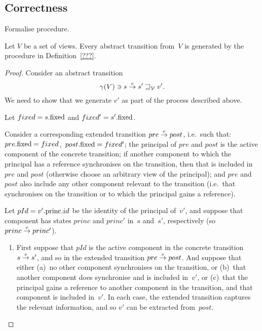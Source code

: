 


\subsection{Correctness}

Formalise procedure.

\begin{lemma}
Let $V$ be a set of views.  Every abstract transition from~$V$ is generated by
the procedure in Definition~\ref{???}.
\end{lemma}

\begin{proof}
Consider an abstract transition
\[
\gamma(V) \ni s \stackrel{e}\rightarrow s' \sqsupseteq_{\mathcal{V}} v'.
\]
We need to show that we generate $v'$ as part of the process described above.

Let $fixed = s.\mathrm{fixed}$ and $fixed' = s'.\mathrm{fixed}$.  

Consider a corresponding extended transition $pre \stackrel{e}\rightarrow post$, i.e.~such
that: $pre.\mathrm{fixed} = fixed$,\, $post.\mathrm{fixed} = fixed'$; the principal of $pre$
and $post$ is the active component of the concrete transition; if another
component to which the principal has a reference synchronises on the
transition, then that is included in~$pre$ and $post$ (otherwise choose an
arbitrary view of the principal); and $pre$ and~$post$ also include any other
component relevant to the transition (i.e.~that synchronises on the transition
or to which the principal gains a reference).


Let $pId = v'.\mathrm{princ}.id$ be the identity of the principal of~$v'$, and suppose
that component has states $princ$ and $princ'$ in~$s$ and~$s'$, respectively
(so $princ \stackrel{e}\rightarrow princ'$).

\begin{enumerate}
\item First suppose that $pId$ is the active component in the concrete
  transition $s \stackrel{e}\rightarrow s'$, and so in the extended transition $pre
  \stackrel{e}\rightarrow post$.  And suppose that either (a)~no other component
  synchronises on the transition, or (b)~that another component does
  synchronise and is included in~$v'$, or (c)~that the principal gains a
  reference to another component in the transition, and that component is
  included in~$v'$.  In each case, the extended transition captures the
  relevant information, and so $v'$ can be extracted from~$post$.


\end{enumerate}
\end{proof}
